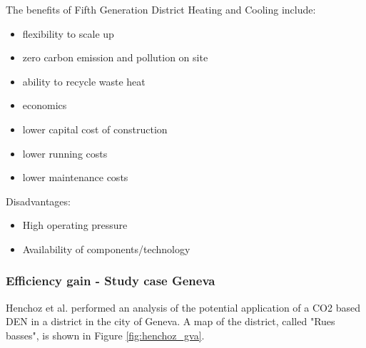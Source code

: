 \documentclass{article}
\newcommand\con{\item[$-$]}
\begin{document}
The benefits of Fifth Generation District Heating and Cooling include:
\begin{itemize}
	\item flexibility to scale up
	\item zero carbon emission and pollution on site
	\item ability to recycle waste heat
	\item economics
	\item lower capital cost of construction
	\item lower running costs
	\item lower maintenance costs
\end{itemize}
 


Disadvantages:

\begin{itemize}
    \con High operating pressure
    \con Availability of components/technology
\end{itemize}




\subsubsection{Efficiency gain - Study case Geneva}
Henchoz et al.\cite{henchozPotentialRefrigerantBased} performed an analysis of the potential application of a CO2 based DEN in a district in the city of Geneva. A map of the district, called "Rues basses", is shown in Figure \ref{fig:henchoz_gva}.
\end{document}
